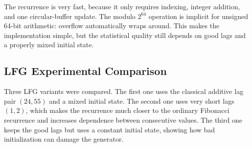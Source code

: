 The recurrence is very fast, because it only requires indexing, integer addition, and one circular-buffer update. The modulo $2^{64}$ operation is implicit for unsigned 64-bit arithmetic: overflow automatically wraps around. This makes the implementation simple, but the statistical quality still depends on good lags and a properly mixed initial state.

\subsection{LFG Experimental Comparison}

Three LFG variants were compared. The first one uses the classical additive lag pair $(24,55)$ and a mixed initial state. The second one uses very short lags $(1,2)$, which makes the recurrence much closer to the ordinary Fibonacci recurrence and increases dependence between consecutive values. The third one keeps the good lags but uses a constant initial state, showing how bad initialization can damage the generator.

\begin{table}[htbp]
\centering
\small
{}
\caption{LFG parameter sets used in the experiment}
\label{tab:lfg-parameters}
\end{table}

\begin{table}[htbp]
\centering
\small
{}
\caption{Basic LFG statistics computed from $100000$ outputs}
\label{tab:lfg-statistics}
\end{table}

